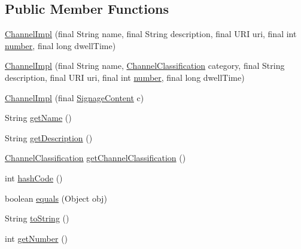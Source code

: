 \subsection*{Public Member Functions}
\begin{DoxyCompactItemize}
\item 
\hyperlink{classgov_1_1fnal_1_1ppd_1_1dd_1_1channel_1_1ChannelImpl_a0136bf00463f15803ac336ede9dd22ef}{Channel\-Impl} (final String name, final String description, final U\-R\-I uri, final int \hyperlink{classgov_1_1fnal_1_1ppd_1_1dd_1_1channel_1_1ChannelImpl_ae4de39eb5e2f7c434f3b71f054ae9735}{number}, final long dwell\-Time)
\item 
\hyperlink{classgov_1_1fnal_1_1ppd_1_1dd_1_1channel_1_1ChannelImpl_a3841b129f361c795ca8f05bd33b14ae8}{Channel\-Impl} (final String name, \hyperlink{classgov_1_1fnal_1_1ppd_1_1dd_1_1changer_1_1ChannelClassification}{Channel\-Classification} category, final String description, final U\-R\-I uri, final int \hyperlink{classgov_1_1fnal_1_1ppd_1_1dd_1_1channel_1_1ChannelImpl_ae4de39eb5e2f7c434f3b71f054ae9735}{number}, final long dwell\-Time)
\item 
\hyperlink{classgov_1_1fnal_1_1ppd_1_1dd_1_1channel_1_1ChannelImpl_aa613d61797497d882a495bc8cb361294}{Channel\-Impl} (final \hyperlink{interfacegov_1_1fnal_1_1ppd_1_1dd_1_1signage_1_1SignageContent}{Signage\-Content} c)
\item 
String \hyperlink{classgov_1_1fnal_1_1ppd_1_1dd_1_1channel_1_1ChannelImpl_afdf0ebebdeb8dce27f58bb59da71dc7d}{get\-Name} ()
\item 
String \hyperlink{classgov_1_1fnal_1_1ppd_1_1dd_1_1channel_1_1ChannelImpl_aa990515286ca3d8245b15b3f50989714}{get\-Description} ()
\item 
\hyperlink{classgov_1_1fnal_1_1ppd_1_1dd_1_1changer_1_1ChannelClassification}{Channel\-Classification} \hyperlink{classgov_1_1fnal_1_1ppd_1_1dd_1_1channel_1_1ChannelImpl_abf99f1bbe72901a00d1d39228f02cff1}{get\-Channel\-Classification} ()
\item 
int \hyperlink{classgov_1_1fnal_1_1ppd_1_1dd_1_1channel_1_1ChannelImpl_aab7741e5c01a8e946c8bf6e9618d0476}{hash\-Code} ()
\item 
boolean \hyperlink{classgov_1_1fnal_1_1ppd_1_1dd_1_1channel_1_1ChannelImpl_af275bb3e62de9af3316698cd7c2074be}{equals} (Object obj)
\item 
String \hyperlink{classgov_1_1fnal_1_1ppd_1_1dd_1_1channel_1_1ChannelImpl_a4af4ac34390c96d255e9483dfa5ad5d6}{to\-String} ()
\item 
int \hyperlink{classgov_1_1fnal_1_1ppd_1_1dd_1_1channel_1_1ChannelImpl_a9d5fbb02930a03147b1240db1371c57a}{get\-Number} ()

\end{DoxyCompactItemize}
